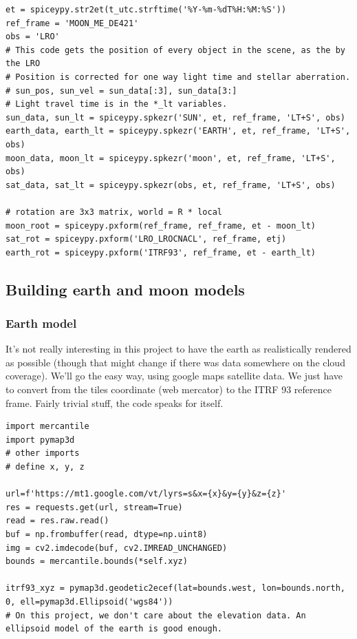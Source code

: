 \documentclass[14pt]{article}
\begin{document}
\begin{verbatim}
et = spiceypy.str2et(t_utc.strftime('%Y-%m-%dT%H:%M:%S'))
ref_frame = 'MOON_ME_DE421'
obs = 'LRO'
# This code gets the position of every object in the scene, as the by the LRO
# Position is corrected for one way light time and stellar aberration.
# sun_pos, sun_vel = sun_data[:3], sun_data[3:]
# Light travel time is in the *_lt variables.
sun_data, sun_lt = spiceypy.spkezr('SUN', et, ref_frame, 'LT+S', obs)
earth_data, earth_lt = spiceypy.spkezr('EARTH', et, ref_frame, 'LT+S', obs)
moon_data, moon_lt = spiceypy.spkezr('moon', et, ref_frame, 'LT+S', obs)
sat_data, sat_lt = spiceypy.spkezr(obs, et, ref_frame, 'LT+S', obs)

# rotation are 3x3 matrix, world = R * local
moon_root = spiceypy.pxform(ref_frame, ref_frame, et - moon_lt)
sat_rot = spiceypy.pxform('LRO_LROCNACL', ref_frame, etj)
earth_rot = spiceypy.pxform('ITRF93', ref_frame, et - earth_lt)

\end{verbatim}

\subsection{Building earth and moon models}


\subsubsection{Earth model}

It's not really interesting in this project to have the earth as realistically rendered as possible (though that might change if there was data somewhere on the cloud coverage).
We'll go the easy way, using google maps satellite data. We just have to convert from the tiles coordinate (web mercator) to the ITRF 93 reference frame. Fairly trivial stuff, the code speaks for itself.

\begin{verbatim}
import mercantile
import pymap3d
# other imports
# define x, y, z

url=f'https://mt1.google.com/vt/lyrs=s&x={x}&y={y}&z={z}'
res = requests.get(url, stream=True)
read = res.raw.read()
buf = np.frombuffer(read, dtype=np.uint8)
img = cv2.imdecode(buf, cv2.IMREAD_UNCHANGED)
bounds = mercantile.bounds(*self.xyz)

itrf93_xyz = pymap3d.geodetic2ecef(lat=bounds.west, lon=bounds.north, 0, ell=pymap3d.Ellipsoid('wgs84'))
# On this project, we don't care about the elevation data. An ellipsoid model of the earth is good enough.

\end{verbatim}
\end{document}
